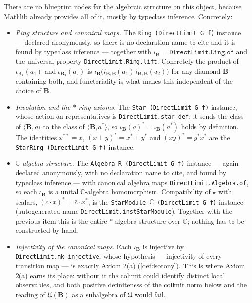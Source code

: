 There are no blueprint nodes for the algebraic structure on this object, because Mathlib already provides all of it, mostly by typeclass inference. Concretely:
\begin{itemize}
    \item \emph{Ring structure and canonical maps.} The \texttt{Ring (DirectLimit G f)} instance --- declared anonymously, so there is no declaration name to cite and it is found by typeclass inference --- together with $\iota_{\mathbf{B}} = \texttt{DirectLimit.Ring.of}$ and the universal property \texttt{DirectLimit.Ring.lift}. Concretely the product of $\iota_{\mathbf{B}_1}(a_1)$ and $\iota_{\mathbf{B}_2}(a_2)$ is $\iota_{\mathbf{B}}\bigl(i_{\mathbf{B}_1\mathbf{B}}(a_1)\, i_{\mathbf{B}_2\mathbf{B}}(a_2)\bigr)$ for any diamond $\mathbf{B}$ containing both, and functoriality is what makes this independent of the choice of $\mathbf{B}$.
    \item \emph{Involution and the $*$-ring axioms.} The \texttt{Star (DirectLimit G f)} instance, whose action on representatives is \texttt{DirectLimit.star\_def}: it sends the class of $\langle \mathbf{B}, a\rangle$ to the class of $\langle \mathbf{B}, a^{*}\rangle$, so $\iota_{\mathbf{B}}(a)^{*} = \iota_{\mathbf{B}}(a^{*})$ holds by definition. The identities $x^{**} = x$, $(x+y)^{*} = x^{*}+y^{*}$ and $(xy)^{*} = y^{*}x^{*}$ are the \texttt{StarRing (DirectLimit G f)} instance.
    \item \emph{$\mathbb{C}$-algebra structure.} The \texttt{Algebra R (DirectLimit G f)} instance --- again declared anonymously, with no declaration name to cite, and found by typeclass inference --- with canonical algebra maps \texttt{DirectLimit.Algebra.of}, so each $\iota_{\mathbf{B}}$ is a unital $\mathbb{C}$-algebra homomorphism. Compatibility of $\star$ with scalars, $(c \cdot x)^{*} = \bar{c} \cdot x^{*}$, is the \texttt{StarModule \ensuremath{\mathbb{C}} (DirectLimit G f)} instance (autogenerated name \texttt{DirectLimit.instStarModule}). Together with the previous item this is the entire $*$-algebra structure over $\mathbb{C}$; nothing has to be constructed by hand.
    \item \emph{Injectivity of the canonical maps.} Each $\iota_{\mathbf{B}}$ is injective by \texttt{DirectLimit.mk\_injective}, whose hypothesis --- injectivity of every transition map --- is exactly Axiom 2(a) (\ref{def:isotony}). This is where Axiom 2(a) earns its place: without it the colimit could identify distinct local observables, and both positive definiteness of the colimit norm below and the reading of $\mathfrak{U}(\mathbf{B})$ as a subalgebra of $\mathfrak{U}$ would fail.
\end{itemize}

